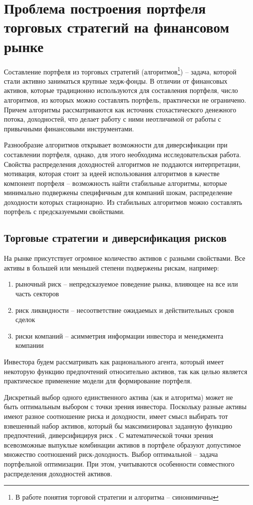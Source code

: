 \chapter{Проблема построения портфеля торговых стратегий на финансовом рынке}
Составление портфеля из торговых стратегий (алгоритмов\footnote{В работе понятия торговой стратегии и алгоритма -- синонимичны}) -- задача, которой стали активно заниматься крупные хедж-фонды. В отличии от финансовых активов, которые традиционно используются для составления портфеля, число алгоритмов, из которых можно составлять портфель, практически не ограничено. Причем алгоритмы рассматриваются как источник стохастического денежного потока, доходностей, что делает работу с ними неотличимой от работы с привычными финансовыми инструментами.

Разнообразие алгоритмов открывает возможности для диверсификации при составлении портфеля, однако, для этого необходима исследовательская работа. Свойства распределения доходностей алгоритмов не поддаются интерпретации, мотивация, которая стоит за идеей использования алгоритмов в качестве компонент портфеля -- возможность найти стабильные алгоритмы, которые минимально подвержены специфичным для компаний шокам, распределение доходности которых стационарно. Из стабильных алгоритмов можно составлять портфель с предсказуемыми свойствами. 

\section{Торговые стратегии и диверсификация рисков}
На рынке присутствует огромное количество активов с разными свойствами. Все активы в большей или меньшей степени подвержены рискам, например:
\begin{enumerate}
	\item рыночный риск -- непредсказуемое поведение рынка, влияющее на все или часть секторов
	\item риск ликвидности -- несоответствие ожидаемых и действительных сроков сделок
	\item риски компаний -- асимметрия информации инвестора и менеджмента компании
\end{enumerate}
Инвестора будем рассматривать как рационального агента, который имеет некоторую функцию предпочтений относительно активов, так как целью является практическое применение модели для формирование портфеля. 

Дискретный выбор одного единственного актива (как и алгоритма) может не быть оптимальным выбором с точки зрения инвестора. Поскольку разные активы имеют разное соотношение риска и доходности, имеет смысл выбирать тот взвешенный набор активов, который бы максимизировал заданную функцию предпочтений, диверсифицируя риск \citep{markovitz1959}. С математической точки зрения всевозможные выпуклые комбинации активов в портфеле образуют допустимое множество соотношений риск-доходность. Выбор оптимальной -- задача портфельной оптимизации. При этом, учитываются особенности совместного распределения доходностей активов.

